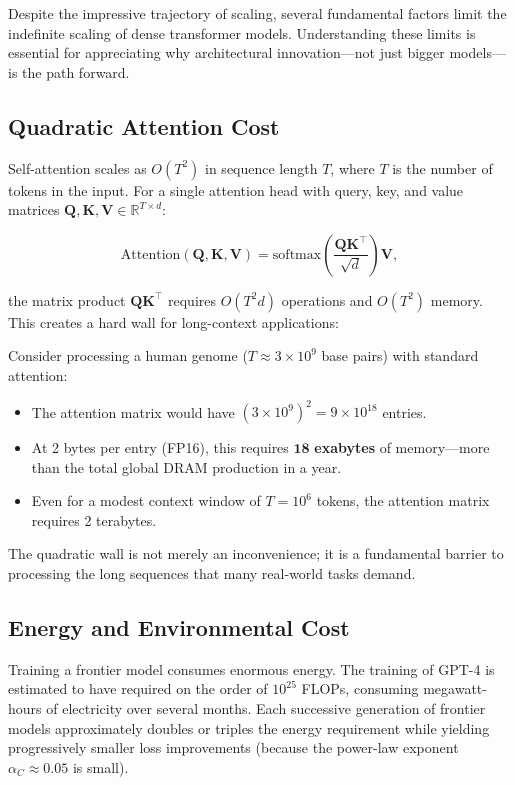 Despite the impressive trajectory of scaling, several fundamental factors limit the indefinite scaling of dense transformer models. Understanding these limits is essential for appreciating why architectural innovation---not just bigger models---is the path forward.

\subsection{Quadratic Attention Cost}

Self-attention scales as $O(T^2)$ in sequence length $T$, where $T$ is the number of tokens in the input. For a single attention head with query, key, and value matrices $\mathbf{Q}, \mathbf{K}, \mathbf{V} \in \mathbb{R}^{T \times d}$:

\begin{equation}
\text{Attention}(\mathbf{Q}, \mathbf{K}, \mathbf{V}) = \text{softmax}\!\left(\frac{\mathbf{Q}\mathbf{K}^\top}{\sqrt{d}}\right)\mathbf{V},
\label{eq:attention-cost}
\end{equation}

the matrix product $\mathbf{Q}\mathbf{K}^\top$ requires $O(T^2 d)$ operations and $O(T^2)$ memory. This creates a hard wall for long-context applications:

\begin{example}
Consider processing a human genome ($T \approx 3 \times 10^9$ base pairs) with standard attention:
\begin{itemize}[leftmargin=1.5em]
  \item The attention matrix would have $(3 \times 10^9)^2 = 9 \times 10^{18}$ entries.
  \item At 2 bytes per entry (FP16), this requires $\mathbf{18}$ \textbf{exabytes} of memory---more than the total global DRAM production in a year.
  \item Even for a modest context window of $T = 10^6$ tokens, the attention matrix requires 2 terabytes.
\end{itemize}
The quadratic wall is not merely an inconvenience; it is a fundamental barrier to processing the long sequences that many real-world tasks demand.
\end{example}

\subsection{Energy and Environmental Cost}

Training a frontier model consumes enormous energy. The training of GPT-4 is estimated to have required on the order of $10^{25}$ FLOPs, consuming megawatt-hours of electricity over several months. Each successive generation of frontier models approximately doubles or triples the energy requirement while yielding progressively smaller loss improvements (because the power-law exponent $\alpha_C \approx 0.05$ is small).

